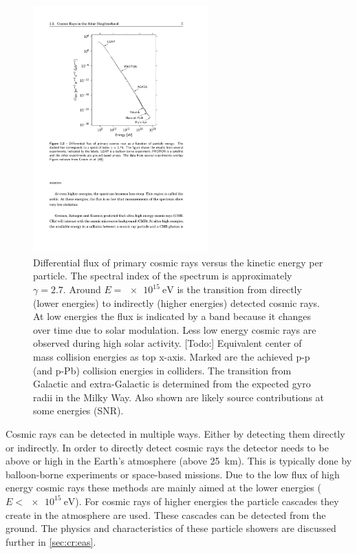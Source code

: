 \begin{figure}
    \centering
    \includegraphics[width=0.6\textwidth]{plots/cosmic-rays/spectrum.pdf}
    \caption{Differential flux of primary cosmic rays versus the kinetic energy per particle. The spectral index of the spectrum is approximately $\gamma = 2.7$. Around $E = \SI{e15}{\eV}$ is the transition from directly (lower energies) to indirectly (higher energies) detected cosmic rays. At low energies the flux is indicated by a band because it changes over time due to solar modulation. Less low energy cosmic rays are observed during high solar activity. [Todo:] Equivalent center of mass collision energies as top x-axis. Marked are the achieved p-p (and p-Pb) collision energies in colliders. The transition from Galactic and extra-Galactic is determined from the expected gyro radii in the Milky Way. Also shown are likely source contributions at some energies (SNR).}
    \label{fig:spectrum}
\end{figure}


Cosmic rays can be detected in multiple ways. Either by detecting them directly or indirectly. In order to directly detect cosmic rays the detector needs to be above or high in the Earth's atmosphere (above \SI{25}{\kilo\meter}). This is typically done by balloon-borne experiments or space-based missions. Due to the low flux of high energy cosmic rays these methods are mainly aimed at the lower energies ($E < \SI{e15}{\eV}$). For cosmic rays of higher energies the particle cascades they create in the atmosphere are used. These cascades can be detected from the ground. The physics and characteristics of these particle showers are discussed further in \cref{sec:cr:eas}.

